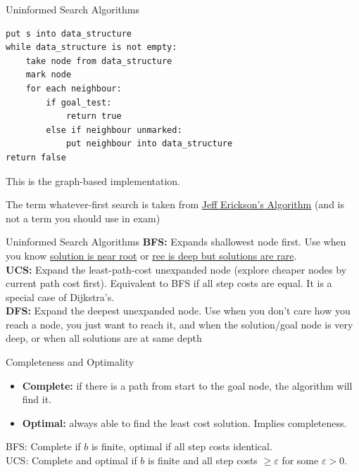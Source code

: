 \documentclass[10pt]{beamer}
\begin{document}
\begin{frame}[fragile]{Uninformed Search Algorithms}
\begin{verbatim}
put s into data_structure
while data_structure is not empty:
    take node from data_structure
    mark node
    for each neighbour:
        if goal_test:
            return true
        else if neighbour unmarked:
            put neighbour into data_structure
return false
\end{verbatim}

This is the graph-based implementation.

The term whatever-first search is taken from \href{algorithms.wtf}{\underline{Jeff Erickson's Algorithm}} (and is not a term you should use in exam)
\end{frame}


\begin{frame}[fragile]{Uninformed Search Algorithms}
\textbf{BFS:} Expands shallowest node first. Use when you know \underline{solution is near root} or \underline{ree is deep but solutions are rare}. \bigskip \\ 
\textbf{UCS:} Expand the least-path-cost unexpanded node (explore cheaper nodes by current path cost first). Equivalent to BFS if all step costs are equal. It is a special case of Dijkstra's. \bigskip \\ 
\textbf{DFS:} Expand the deepest unexpanded node. Use when you don’t care how you reach a node, you just want to reach it, and when the solution/goal node is very deep, or when all solutions are at same depth
\end{frame}

\begin{frame}[fragile]{Completeness and Optimality}
\begin{itemize}
  \item \textbf{Complete:} if there is a path from start to the goal node, the algorithm will find it. 
  \item \textbf{Optimal:} always able to find the least cost solution. Implies completeness.
\end{itemize}
BFS: Complete if $b$ is finite, optimal if all step costs identical. \\
UCS: Complete and optimal if $b$ is finite and all step costs $\geq \varepsilon$ for some $\varepsilon > 0$.
\end{frame}
\end{document}
